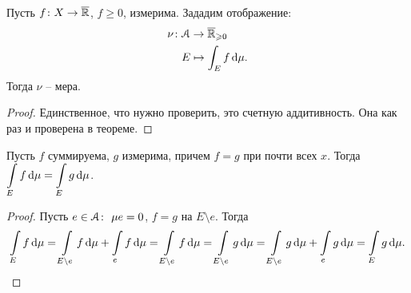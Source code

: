 \begin{corollary}
    Пусть $f \colon X \to \overline{\mathbb{R}}$, $f \geqslant 0$, измерима. Зададим отображение:
    \begin{align*}
        \nu \colon &\mathcal{A} \to \overline{\mathbb{R}}_{\geqslant 0} \\ 
                   &E \mapsto \int_E{f \,\mathrm{d}\mu}
    .\end{align*}
    Тогда $\nu$ -- мера.
\end{corollary}
\begin{proof}
    Единственное, что нужно проверить, это счетную аддитивность. Она как раз и проверена в теореме.
\end{proof}

\begin{lemma}
    Пусть $f$ суммируема, $g$ измерима, причем $f = g$ при почти всех $x$. Тогда
    $\displaystyle \int\limits_E{f \,\mathrm{d}\mu} = \int\limits_E{g \,\mathrm{d}\mu}$.
\end{lemma}
\begin{proof}
    Пусть $e \in \mathcal{A}\colon~ \mu{e} = 0$, $f = g$ на $E \setminus e$. Тогда
\[
    \int\limits_{E}{f \,\mathrm{d}\mu} = \int\limits_{E \setminus e}{f \,\mathrm{d}\mu} + \int\limits_{e}{f \,\mathrm{d}\mu}
    = \int\limits_{E \setminus e}{f \,\mathrm{d}\mu} = \int\limits_{E \setminus e}{g \,\mathrm{d}\mu}
    = \int\limits_{E \setminus e}{g \,\mathrm{d}\mu} + \int\limits_e{g \,\mathrm{d}\mu} = \int\limits_{E}{g \,\mathrm{d}\mu}
.\]
\end{proof}

